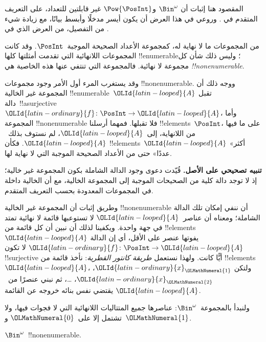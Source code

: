 \documentclass[../../../include/open-logic-section]{subfiles}
\begin{document}


\begin{editorial}
المقصود هنا إثبات أن $\Bin^\omega$ و$\Pow{\PosInt}$ غير قابلتين للتعداد، على التعريف المتقدم في . وروعي في هذا العرض أن يكون أيسر مدخلًا وأبسط بيانًا، مع زيادة شيء من التفصيل، من العرض الذي في .
\end{editorial}

من المجموعات ما لا نهاية له، كمجموعة الأعداد الصحيحة الموجبة~$\PosInt$. وقد كانت المجموعات اللانهائية التي تقدمت أمثلتها كلها !!{enumerable}؛ وليس ذلك شأن كل مجموعة لا نهائية. فالمجموعة التي تنتفي عنها هذه الخاصية هي \emph{!!{nonenumerable}}.

وقد يستغرب المرء أول الأمر وجود مجموعات !!{nonenumerable}. ووجه ذلك أن المجموعة غير الخالية !!{enumerable}~${\OLId{latin-looped}{A}}$ تقبل دالة~!!a{surjective} ${\OLId{latin-ordinary}{f}} \colon \PosInt \to {\OLId{latin-looped}{A}}$، وأما المجموعة !!{nonenumerable} فلا تقبلها. فمهما أرسلنا !!{element}s~$\PosInt$، على ما فيها من اللانهاية، إلى~${\OLId{latin-looped}{A}}$، لم نستوف بذلك~${\OLId{latin-looped}{A}}$. فكأن !!{element}s~${\OLId{latin-looped}{A}}$ «أكثر عددًا» حتى من الأعداد الصحيحة الموجبة التي لا نهاية لها.

\textbf{تنبيه تصحيحي على الأصل.} قُيّدت دعوى وجود الدالة الشاملة بكون
المجموعة غير خالية؛ إذ لا توجد دالة كلية من الصحيحات الموجبة إلى المجموعة الخالية،
مع أن الخالية داخلة في المجموعات المعدودة بحسب التعريف المتقدم.

وطريق إثبات أن المجموعة غير الخالية !!{nonenumerable} أن ننفي إمكان تلك الدالة الشاملة؛ ومعناه أن عناصر~${\OLId{latin-looped}{A}}$ لا تستوعبها قائمة لا نهائية تمتد في جهة واحدة. ويكفينا لذلك أن نبين أن كل قائمة من !!{element}s~${\OLId{latin-looped}{A}}$ يفوتها عنصر على الأقل، أي إن الدالة ${\OLId{latin-ordinary}{f}}\colon \PosInt \to {\OLId{latin-looped}{A}}$ لا تكون !!{surjective} أيًّا كانت. ولهذا نستعمل \emph{طريقة كانتور القطرية}: نأخذ قائمة من !!{element}s~${\OLId{latin-looped}{A}}$، ولتكن ${\OLId{latin-ordinary}{x}}_{\OLMathNumeral{1}}$، ${\OLId{latin-ordinary}{x}}_{\OLMathNumeral{2}}$، \dots، ثم نبني عنصرًا من~${\OLId{latin-looped}{A}}$ يقتضي نفس بنائه خروجه عن القائمة.

ولنبدأ بالمجموعة~$\Bin^\omega$: عناصرها جميع المتتاليات اللانهائية التي لا فجوات فيها، ولا تشتمل إلا على~${\OLMathNumeral{0}}$ و~${\OLMathNumeral{1}}$.

\begin{thm}
$\Bin^\omega$~!!{nonenumerable}.
\end{thm}
\end{document}

